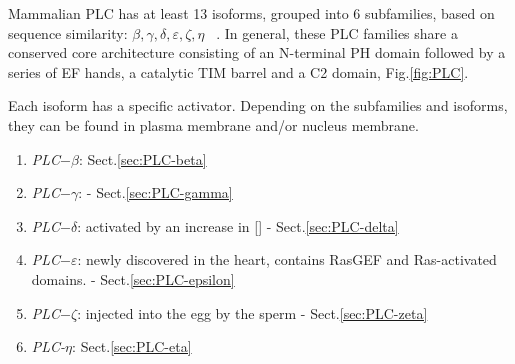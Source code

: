 Mammalian PLC has at least 13 isoforms, grouped into 6 subfamilies, based on
sequence similarity:
$\beta, \gamma, \delta, \varepsilon, \zeta, \eta$
~\citep{rhee2001rps,saunders2004plcz,cockcroft2006plc}.
In general, these PLC families share a conserved core architecture consisting of
an N-terminal PH domain followed by a series of EF hands, a catalytic TIM barrel
and a C2 domain, Fig.\ref{fig:PLC}.


Each isoform has a specific activator.  Depending on the subfamilies and
isoforms, they can be found in plasma membrane and/or nucleus membrane. 

\begin{enumerate}
\item {\it PLC$-\beta$}: Sect.\ref{sec:PLC-beta}

\item {\it PLC$-\gamma$}: - Sect.\ref{sec:PLC-gamma}

\item {\it PLC$-\delta$}: activated by an increase in [] -
Sect.\ref{sec:PLC-delta}


\item {\it PLC$-\varepsilon$}: newly discovered in the heart, contains
  RasGEF and Ras-activated domains. - Sect.\ref{sec:PLC-epsilon}

\item {\it PLC$-\zeta$}: injected into the egg by the sperm -
Sect.\ref{sec:PLC-zeta}



\item {\it PLC-$\eta$}: Sect.\ref{sec:PLC-eta}
\end{enumerate}




% 


